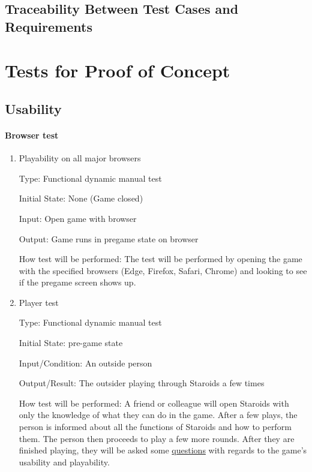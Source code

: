 \documentclass[12pt, titlepage]{article}
\begin{document}
\subsection{Traceability Between Test Cases and Requirements}

\section{Tests for Proof of Concept}

\subsection{Usability}

\paragraph{Browser test}

\begin{enumerate}

\item{Playability on all major browsers\\}

Type: Functional dynamic manual test

Initial State: None (Game closed)

Input: Open game with browser

Output: Game runs in pregame state on browser

How test will be performed: The test will be performed by opening the game with the specified browsers (Edge, Firefox, Safari, Chrome) and looking to see if the pregame screen shows up.

\item{Player test\\}

Type: Functional dynamic manual test

Initial State: pre-game state

Input/Condition: An outside person

Output/Result: The outsider playing through Staroids a few times

How test will be performed: A friend or colleague will open Staroids with only the knowledge of what they can do in the game. After a few plays, the person is informed about all the functions of Staroids and how to perform them. The person then proceeds to play a few more rounds. After they are finished playing, they will be asked some \hyperref[interview:questions]{questions} with regards to the game's usability and playability.

\end{enumerate}
\end{document}

